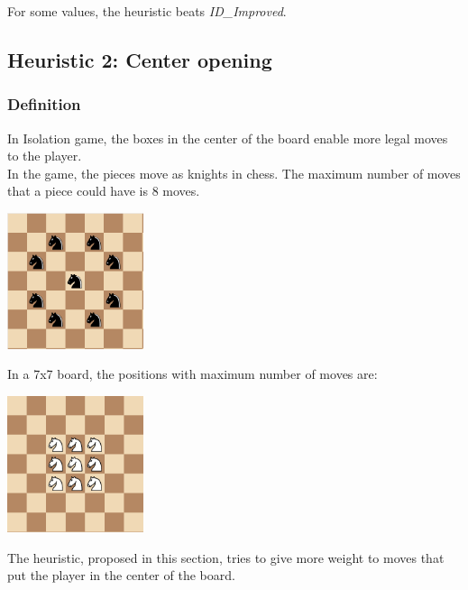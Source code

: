 \documentclass[10pt, a4paper,english]{article}
\begin{document}
For some values, the heuristic beats \textit{ID\_Improved}.

\subsection{Heuristic 2: Center opening}

\subsubsection{Definition}

In Isolation game, the boxes in the center of the board enable more legal moves to the player. \\ 

In the game, the pieces move as knights in chess. The maximum number of moves that a piece could have is 8 moves. \\ 

\begin{center}
\includegraphics[width=0.3\textwidth]{max_moves.png}\\
\end{center}

In a 7x7 board, the positions with maximum number of moves are: \\

\begin{center}
\includegraphics[width=0.3\textwidth]{center_moves.png}\\
\end{center}

The heuristic, proposed in this section, tries to give more weight to moves that put the player in the center of the board. \\
\end{document}

